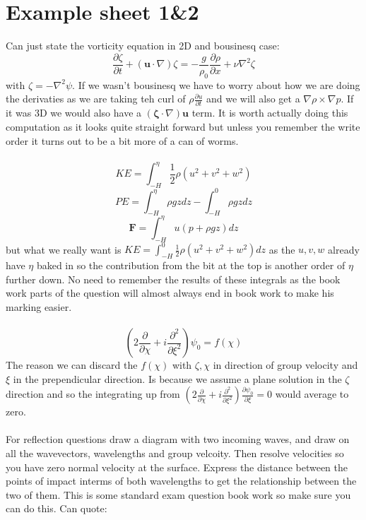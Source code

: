 \documentclass{article}
\begin{document}
           \section{Example sheet 1&2}
           Can just state the vorticity equation in 2D and bousinesq case:
           $$
            \frac{\partial \zeta}{\partial t} + (\bm u \cdot \nabla) \zeta = - \frac{g}{\rho_0} \frac{\partial \rho}{\partial x} + \nu \nabla^2 \zeta
           $$
           with $\zeta = - \nabla^2 \psi$. If we wasn't bousinesq we have to worry about how we are doing the derivaties as we are taking teh curl of $\rho \frac{\partial u}{\partial t}$ and we will also get a $\nabla \rho \times \nabla p$. If it was 3D we would also have a $(\bm \zeta \cdot \nabla) \bm u$ term. It is worth actually doing this computation as it looks quite straight forward but unless you remember the write order it turns out to be a bit more of a can of worms.\\\\
           $$
           KE = \int_{-H}^{\eta} \frac{1}{2} \rho ( u^2 + v^2 + w^2)
           $$
           $$
           PE = \int_{-H}^{\eta} \rho g z dz - \int_{-H}^{0} \rho g z dz
           $$
           $$
            \bm F = \int_{-H}^{\eta} u(p + \rho gz) dz
           $$
           but what we really want is $KE = \int_{-H}^0 \frac{1}{2} \rho (u^2 + v^2 + w^2) dz$ as the $u, v, w$ already have $\eta$ baked in so the contribution from the bit at the top is another order of $\eta$ further down. No need to remember the results of these integrals as the book work parts of the question will almost always end in book work to make his marking easier.\\\\
           $$
            ( 2 \frac{\partial}{\partial \chi} + i \frac{\partial^2}{\partial \xi^2}) \psi_0 = f(\chi)
           $$
           The reason we can discard the $f(\chi)$ with $\zeta, \chi$ in direction of group velocity and $\xi$ in the prependicular direction. Is because we assume a plane solution in the $\zeta$ direction and so the integrating up from $( 2 \frac{\partial}{\partial \chi} + i \frac{\partial^2}{\partial \xi^2}) \frac{\partial \psi_0}{\partial \xi} = 0$ would average to zero.\\\\
           For reflection questions draw a diagram with two incoming waves, and draw on all the wavevectors, wavelengths and group velcoity. Then resolve velocities so you have zero normal velocity at the surface. Express the distance between the points of impact interms of both wavelengths to get the relationship between the two of them. This is some standard exam question book work so make sure you can do this. Can quote:
\end{document}
